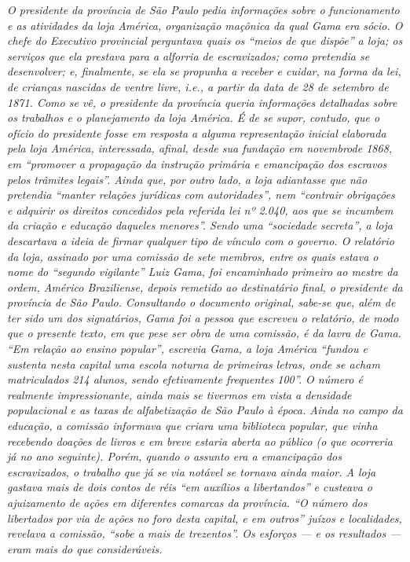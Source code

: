 \begin{didascalia}
\emph{O presidente da província de São Paulo pedia informações sobre o
funcionamento e as atividades da loja América, organização maçônica da
qual Gama era sócio. O chefe do Executivo provincial perguntava quais os
``meios de que dispõe'' a loja; os serviços que ela prestava para a
alforria de escravizados; como pretendia se desenvolver; e, finalmente,
se ela se propunha a receber e cuidar, na forma da lei, de crianças
nascidas de ventre livre, i.e., a partir da data de 28 de setembro de 1871. Como se
vê, o presidente da província queria informações detalhadas sobre os
trabalhos e o planejamento da loja América. É de se supor, contudo, que
o ofício do presidente fosse em resposta a alguma representação inicial
elaborada pela loja América, interessada, afinal, desde sua fundação em
novembrode 1868, em ``promover a propagação da instrução primária e
emancipação dos escravos pelos trâmites legais''. Ainda que, por outro
lado, a loja adiantasse que não pretendia ``manter relações jurídicas com
autoridades'', nem ``contrair obrigações e adquirir os direitos concedidos
pela referida lei nº 2.040, aos que se incumbem da criação e educação
daqueles menores''. Sendo uma ``sociedade secreta'', a loja descartava a
ideia de firmar qualquer tipo de vínculo com o governo. O relatório da
loja, assinado por uma comissão de sete membros, entre os quais estava o
nome do ``segundo vigilante'' Luiz Gama, foi encaminhado primeiro ao
mestre da ordem, Américo Braziliense, depois remetido ao destinatário
final, o presidente da província de São Paulo. Consultando o documento
original, sabe-se que, além de ter sido um dos signatários, Gama foi a
pessoa que escreveu o relatório, de modo que o presente texto, em que
pese ser obra de uma comissão, é da lavra de Gama. ``Em relação ao ensino
popular'', escrevia Gama, a loja América ``fundou e sustenta nesta capital
uma escola noturna de primeiras letras, onde se acham matriculados 214
alunos, sendo efetivamente frequentes 100''. O número é realmente
impressionante, ainda mais se tivermos em vista a densidade populacional
e as taxas de alfabetização de São Paulo à época. Ainda no campo da
educação, a comissão informava que criara uma biblioteca popular, que
vinha recebendo doações de livros e em breve estaria aberta ao público
(o que ocorreria já no ano seguinte). Porém, quando o assunto era a
emancipação dos escravizados, o trabalho que já se via notável se
tornava ainda maior. A loja gastava mais de dois contos de réis ``em
auxílios a libertandos'' e custeava o ajuizamento de ações em diferentes
comarcas da província. ``O número dos libertados por via de ações no foro
desta capital, e em outros'' juízos e localidades, revelava a comissão,
``sobe a mais de trezentos''. Os esforços --- e os resultados --- eram mais
do que consideráveis.}
\end{didascalia}


